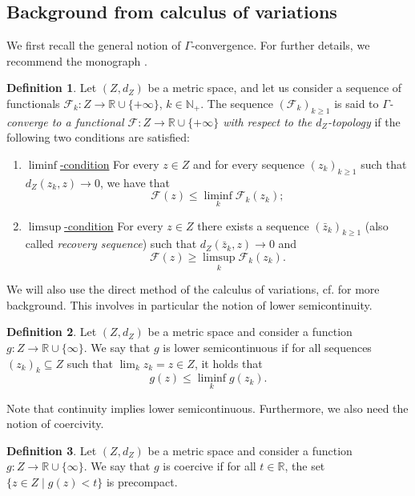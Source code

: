 \documentclass[letterpaper, 10 pt, conference]{IEEEconf}  %
\newcommand{\R}{\mathbb{R}} %
\newcommand{\Np}{\mathbb{N}_+} %
\theoremstyle{theorem}
\theoremstyle{definition}
\newtheorem{definition}{Definition}
\theoremstyle{remark}
\begin{document}
\subsection{Background from calculus of variations}
We first recall the general notion of $\Gamma$-convergence. For further details, we recommend the monograph \cite{dalmaso1993introduction}.
\begin{definition} \label{def:Gamma-conv}
    Let $(Z,d_Z)$ be a metric space, and let us consider a sequence of functionals %
    $\mathcal{F}_k\colon Z \to \R \cup \{ +\infty\}$, $k\in\Np$.
    The sequence $(\mathcal{F}_k)_{k\geq 1}$ is said to \emph{$\Gamma$-converge to a functional $\mathcal{F} \colon Z \to \R \cup \{ +\infty\}$ with respect to the $d_Z$-topology} if the following two conditions are satisfied:
    \begin{enumerate}
        \item \underline{$\liminf$-condition} For every $z \in Z$ and for every sequence $(z_k)_{k\geq 1}$ such that $d_Z(z_k,z)\to 0$, we have that
        \begin{equation*}
            \mathcal{F}(z) \leq \liminf_{k} \mathcal{F}_k(z_k);
        \end{equation*}
        \item \underline{$\limsup$-condition} For every $z \in Z$ there exists a sequence $(\bar z_k)_{k\geq 1}$ (also called \emph{recovery sequence}) such that $d_Z(\bar z_k,z)\to 0$ and 
        \begin{equation*}
            \mathcal{F}(z) \geq \limsup_{k} \mathcal{F}_k(z_k).
        \end{equation*}
    \end{enumerate}
\end{definition}
We will also use the direct method of the calculus of variations, cf. \cite[Chapter~1]{dalmaso1993introduction} for more background.
This involves in particular the notion of lower semicontinuity.
\begin{definition}
Let $(Z,d_Z)$ be a metric space and consider a function $g \colon Z \rightarrow \R \cup \{\infty\}$.
We say that $g$ is lower semicontinuous if for all sequences $(z_k)_k\subseteq Z$ such that $\lim_k z_k = z \in Z$, it holds that
\begin{equation}
    g(z) \leq \liminf_k g(z_k).
\end{equation}
\end{definition}
Note that continuity implies lower semicontinuous.
Furthermore, we also need the notion of coercivity.
\begin{definition}
Let $(Z,d_Z)$ be a metric space and consider a function $g: Z \rightarrow \R \cup \{\infty\}$.
We say that $g$ is coercive if for all $t\in\R$, the set $\{z \in Z \mid g(z) < t\}$ is precompact.
\end{definition}
\end{document}
